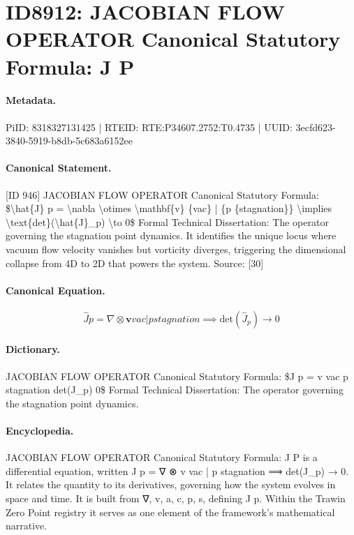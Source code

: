 \section*{ID8912: JACOBIAN FLOW OPERATOR Canonical Statutory Formula: J P}
\paragraph{Metadata.}
PiID: 8318327131425 | RTEID: RTE:P34607.2752:T0.4735 | UUID: 3ecfd623-3840-5919-b8db-5c683a6152ee

\paragraph{Canonical Statement.}
[ID 946] JACOBIAN FLOW OPERATOR Canonical Statutory Formula: \$\textbackslash{}hat\{J\} p = \textbackslash{}nabla \textbackslash{}otimes \textbackslash{}mathbf\{v\} \{vac\} | \{p \{stagnation\}\} \textbackslash{}implies \textbackslash{}text\{det\}(\textbackslash{}hat\{J\}\_p) \textbackslash{}to 0\$ Formal Technical Dissertation: The operator governing the stagnation point dynamics. It identifies the unique locus where vacuum flow velocity vanishes but vorticity diverges, triggering the dimensional collapse from 4D to 2D that powers the system. Source: [30]

\paragraph{Canonical Equation.}
\[
\hat{J} p = \nabla \otimes \mathbf{v} {vac} | {p {stagnation}} \implies \text{det}(\hat{J}_p) \to 0
\]

\paragraph{Dictionary.}
JACOBIAN FLOW OPERATOR Canonical Statutory Formula: \$J p = v vac p stagnation det(J\_p) 0\$ Formal Technical Dissertation: The operator governing the stagnation point dynamics.

\paragraph{Encyclopedia.}
JACOBIAN FLOW OPERATOR Canonical Statutory Formula: J P is a differential equation, written J p = ∇ ⊗ v vac | p stagnation ⟹ det(J\_p) → 0. It relates the quantity to its derivatives, governing how the system evolves in space and time. It is built from ∇, v, a, c, p, s, defining J p. Within the Trawin Zero Point registry it serves as one element of the framework's mathematical narrative.
